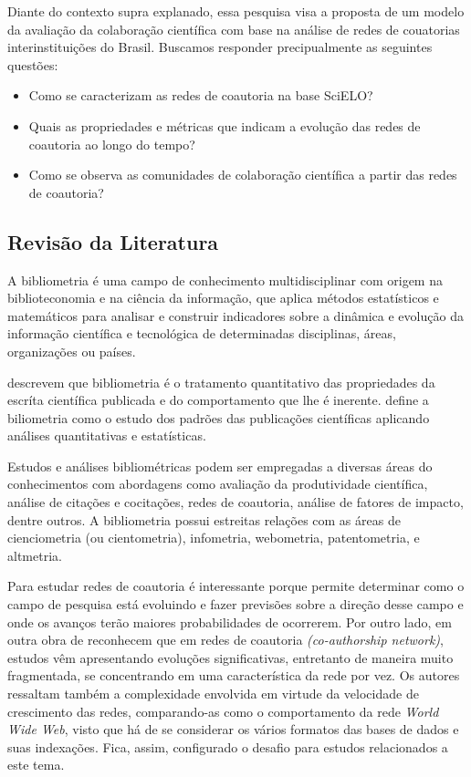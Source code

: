 \documentclass[12pt]{article}
\begin{document}
Diante do contexto supra explanado, essa pesquisa visa a proposta de um modelo da avaliação da colaboração científica com base na análise de redes de couatorias interinstituições do Brasil. 
Buscamos responder precipualmente as seguintes questões:
\begin{itemize}
\item Como se caracterizam as redes de coautoria na base SciELO?
\item Quais as propriedades e métricas que indicam a evolução das redes de coautoria ao longo do tempo?
\item Como se observa as comunidades de colaboração científica a partir das redes de coautoria?
\end{itemize}

\subsection{\textbf{Revisão da Literatura}}

A bibliometria é uma campo de conhecimento multidisciplinar com origem na biblioteconomia e na ciência da informação, que aplica métodos estatísticos e matemáticos para analisar e construir indicadores sobre a dinâmica e evolução da informação científica e tecnológica de determinadas disciplinas, áreas, organizações ou países.

\cite{pritchard1969statistical} descrevem que bibliometria é o tratamento quantitativo das propriedades da escríta científica publicada e do comportamento que lhe é inerente. 
\cite{osareh1996bibliometrics} define a biliometria como o estudo dos padrões das publicações científicas aplicando análises quantitativas e estatísticas. %

Estudos e análises bibliométricas podem ser empregadas a diversas áreas do conhecimentos com abordagens como avaliação da produtividade científica, análise de citações e cocitações, redes de coautoria, análise de fatores de impacto, dentre outros. A bibliometria possui estreitas relações com as áreas de cienciometria (ou cientometria), infometria, webometria, patentometria, e altmetria.

Para \cite{barabasi2002evolution} estudar redes de coautoria é interessante porque permite determinar como o campo de pesquisa está evoluindo e fazer previsões sobre a direção desse campo e onde os avanços terão maiores probabilidades de ocorrerem. Por outro lado, em outra obra de \cite{Barabasi2001} reconhecem que em redes de coautoria \textit{(co-authorship network)}, estudos vêm apresentando evoluções significativas, entretanto de maneira muito fragmentada, se concentrando em uma característica da rede por vez. 
Os autores ressaltam também a complexidade envolvida em virtude da velocidade de crescimento das redes, comparando-as como o comportamento da rede \textit{World Wide Web}, visto que há de se considerar os vários formatos das bases de dados e suas indexações. Fica, assim, configurado o desafio para estudos relacionados a este tema.
\end{document}
